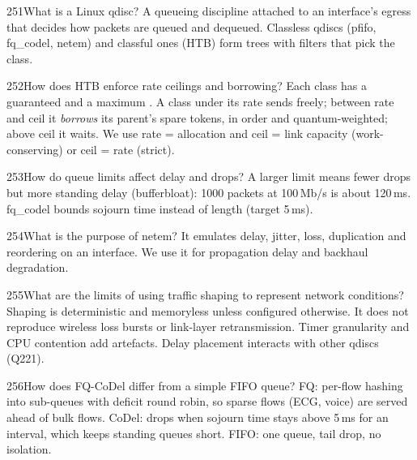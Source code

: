 \begin{qa}{251}{What is a Linux qdisc?}
A queueing discipline attached to an interface's egress that decides how packets are queued and dequeued.
Classless qdiscs (pfifo, fq\_codel, netem) and classful ones (HTB) form trees with filters that pick the class.
\end{qa}

\begin{qa}{252}{How does HTB enforce rate ceilings and borrowing?}
Each class has a guaranteed  and a maximum . A class under its rate sends freely; between rate
and ceil it \emph{borrows} its parent's spare tokens, in  order and quantum-weighted; above ceil it waits.
We use rate = allocation and ceil = link capacity (work-conserving) or ceil = rate (strict).
\end{qa}

\begin{qa}{253}{How do queue limits affect delay and drops?}
A larger limit means fewer drops but more standing delay (bufferbloat): 1000 packets at 100\,Mb/s is about 120\,ms.
fq\_codel bounds sojourn time instead of length (target 5\,ms).
\end{qa}

\begin{qa}{254}{What is the purpose of netem?}
It emulates delay, jitter, loss, duplication and reordering on an interface. We use it for propagation delay and
backhaul degradation.
\end{qa}

\begin{qa}{255}{What are the limits of using traffic shaping to represent network conditions?}
Shaping is deterministic and memoryless unless configured otherwise. It does not reproduce wireless loss bursts or
link-layer retransmission. Timer granularity and CPU contention add artefacts. Delay placement interacts with other
qdiscs (Q221).
\end{qa}

\begin{qa}{256}{How does FQ-CoDel differ from a simple FIFO queue?}
FQ: per-flow hashing into sub-queues with deficit round robin, so sparse flows (ECG, voice) are served ahead of bulk
flows. CoDel: drops when sojourn time stays above 5\,ms for an interval, which keeps standing queues short.
FIFO: one queue, tail drop, no isolation.
\end{qa}

